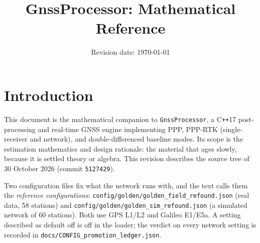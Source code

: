 \documentclass[11pt,letterpaper]{article}
\title{\bfseries GnssProcessor: Mathematical Reference}
\author{}
\date{Revision date: \today}
\begin{document}
\maketitle
\tableofcontents
\bigskip

\section{Introduction}\label{sec:intro}

This document is the mathematical companion to \texttt{GnssProcessor}, a
C\texttt{++}17 post-processing and real-time GNSS engine implementing
PPP, PPP-RTK (single-receiver and network), and double-differenced
baseline modes.  Its scope is the estimation mathematics and design
rationale: the material that ages slowly, because it is settled theory
or algebra.  This revision describes the source tree of 30 October 2026
(commit \texttt{5127429}).

Two configuration files fix what the network runs with, and the text
calls them the \emph{reference configurations}:
\texttt{config/golden/golden\_field\_refound.json} (real data, 58
stations) and \texttt{config/golden/golden\_sim\_refound.json} (a
simulated network of 60 stations).  Both use GPS L1/L2 and Galileo
E1/E5a.  A setting described as default off is off in the loader; the
verdict on every network setting is recorded in
\texttt{docs/CONFIG\_promotion\_ledger.json}.
\end{document}
